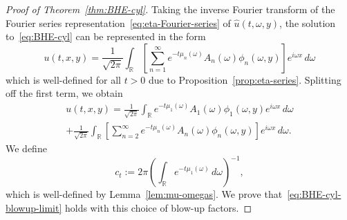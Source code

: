 \documentclass[a4paper, reqno,titlepage]{amsart}
\numberwithin{equation}{section}
\theoremstyle{plain}
\theoremstyle{definition}
\theoremstyle{remark}
\newcommand{\RR}{\mathbb{R}}
\begin{document}
\begin{proof}[Proof of Theorem~\ref{thm:BHE-cyl}]
  Taking the inverse Fourier transform of the Fourier series representation~\eqref{eq:eta-Fourier-series} of $\widehat{u}(t,\omega,y)$, the solution to~\eqref{eq:BHE-cyl} can be represented in the form
  \begin{equation*}
    u(t,x,y)
    = \frac{1}{\sqrt{2\pi}}\int_{\RR} \left[ \sum_{n=1}^\infty e^{-t \mu_n(\omega)} A_n(\omega) \phi_n(\omega, y) \right] e^{i \omega x} \,d\omega
  \end{equation*}
  which is well-defined for all $t>0$ due to Proposition~\ref{prop:eta-series}. Splitting off the first term, we obtain
  \begin{multline}
    \label{eq:u-split1}
    u(t,x,y)
    = \frac{1}{\sqrt{2\pi}}\int_{\RR} e^{-t \mu_1(\omega)} A_1(\omega) \phi_1(\omega, y) e^{i\omega x} \,d\omega \\
    + \frac{1}{\sqrt{2\pi}}\int_{\RR} \left[ \sum_{n=2}^\infty e^{-t \mu_n(\omega)} A_n(\omega) \phi_n(\omega, y) \right] e^{i \omega x} \,d\omega.
  \end{multline}
  We define
  \begin{equation}
    \label{eq:ct-cyl}
    c_t:=2\pi\left(\int_{\RR}e^{-t\mu_1(\omega)}\,d\omega\right)^{-1},
  \end{equation}
  which is well-defined by Lemma~\ref{lem:mu-omegas}. We prove that~\eqref{eq:BHE-cyl-blowup-limit} holds with this choice of blow-up factors.


\end{proof}
\end{document}

